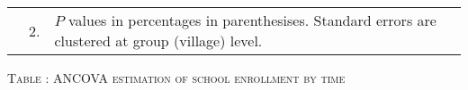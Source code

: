 \begin{minipage}[t]{14cm}
\begin{tabular}{>{\hfill\scriptsize}p{1cm}<{}>{\hfill\scriptsize}p{.25cm}<{}>{\scriptsize}p{14cm}<{\hfill}}
& 2. & $P$ values in percentages in parenthesises. Standard errors are clustered at group (village) level.%
\end{tabular}
\end{minipage}

\hspace{-1cm}\begin{minipage}[t]{14cm}
\hfil\textsc{\normalsize Table \thetable: ANCOVA estimation of school enrollment by time\label{tab ANCOVA enroll time varying1}}\\
\setlength{\tabcolsep}{1pt}
\setlength{\baselineskip}{8pt}
\renewcommand{\arraystretch}{.525}
\hfil{}
\end{minipage}

